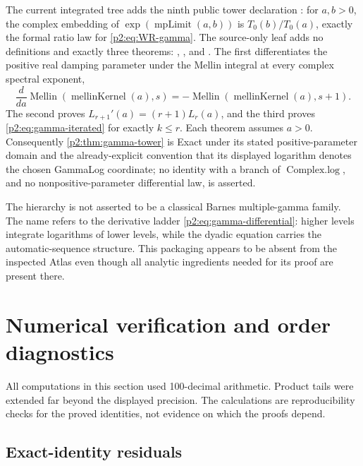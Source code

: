 \documentclass[11pt,oneside]{article}
\numberwithin{equation}{section}
\theoremstyle{definition}
\theoremstyle{remark}
\begin{document}
The current integrated tree adds the ninth public tower declaration
: for \(a,b>0\), the
complex embedding of \(\exp(\operatorname{mpLimit}(a,b))\) is
\(T_0(b)/T_0(a)\), exactly the formal ratio law for
\eqref{p2:eq:WR-gamma}.  The source-only
 leaf adds no definitions and
exactly three theorems:
,
, and
.  The first differentiates
the positive real damping parameter under the Mellin integral at every
complex spectral exponent,
\[
 \frac{d}{da}\operatorname{Mellin}(\operatorname{mellinKernel}(a),s)
 =-\operatorname{Mellin}(\operatorname{mellinKernel}(a),s+1).
\]
The second proves \(L_{r+1}'(a)=(r+1)L_r(a)\), and the third proves
\eqref{p2:eq:gamma-iterated} for exactly \(k\le r\).  Each theorem assumes
\(a>0\).  Consequently \cref{p2:thm:gamma-tower} is Exact under its stated
positive-parameter domain and the already-explicit convention that its
displayed logarithm denotes the chosen GammaLog coordinate; no identity with
a branch of \(\operatorname{Complex.log}\), and no nonpositive-parameter
differential law, is asserted.

\begin{remark}
The hierarchy is not asserted to be a classical Barnes multiple-gamma family.  The name refers
to the derivative ladder \eqref{p2:eq:gamma-differential}: higher levels integrate logarithms of
lower levels, while the dyadic equation carries the automatic-sequence structure.  This
packaging appears to be absent from the inspected Atlas even though all analytic ingredients
needed for its proof are present there.
\end{remark}

\section{Numerical verification and order diagnostics}
\label{p2:sec:numerics}

All computations in this section used 100-decimal arithmetic.  Product tails were extended
far beyond the displayed precision.  The calculations are reproducibility checks for the
proved identities, not evidence on which the proofs depend.

\subsection{Exact-identity residuals}
\end{document}
